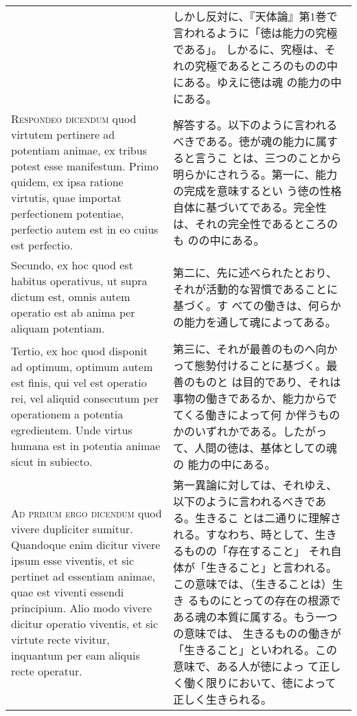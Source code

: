\documentclass[10pt]{jsarticle}
\begin{document}
\begin{longtable}{p{21em}p{21em}}
&

しかし反対に、『天体論』第1巻で言われるように「徳は能力の究極である」。
しかるに、究極は、それの究極であるところのものの中にある。ゆえに徳は魂
の能力の中にある。

\\

{\scshape Respondeo dicendum} quod virtutem pertinere ad potentiam
animae, ex tribus potest esse manifestum. Primo quidem, ex ipsa
ratione virtutis, quae importat perfectionem potentiae, perfectio
autem est in eo cuius est perfectio.

&

解答する。以下のように言われるべきである。徳が魂の能力に属すると言うこ
とは、三つのことから明らかにされうる。第一に、能力の完成を意味するとい
う徳の性格自体に基づいてである。完全性は、それの完全性であるところのも
のの中にある。

\\

Secundo, ex hoc quod est habitus operativus, ut supra dictum est,
omnis autem operatio est ab anima per aliquam potentiam.

&

第二に、先に述べられたとおり、それが活動的な習慣であることに基づく。す
べての働きは、何らかの能力を通して魂によってある。

\\

Tertio, ex hoc quod disponit ad optimum, optimum autem est finis, qui
vel est operatio rei, vel aliquid consecutum per operationem a
potentia egredientem. Unde virtus humana est in potentia animae sicut
in subiecto.

&

第三に、それが最善のものへ向かって態勢付けることに基づく。最善のものと
は目的であり、それは事物の働きであるか、能力からでてくる働きによって何
か伴うものかのいずれかである。したがって、人間の徳は、基体としての魂の
能力の中にある。

\\

{\scshape Ad primum ergo dicendum} quod vivere dupliciter
sumitur. Quandoque enim dicitur vivere ipsum esse viventis, et sic
pertinet ad essentiam animae, quae est viventi essendi
principium. Alio modo vivere dicitur operatio viventis, et sic virtute
recte vivitur, inquantum per eam aliquis recte operatur.

&

第一異論に対しては、それゆえ、以下のように言われるべきである。生きるこ
とは二通りに理解される。すなわち、時として、生きるものの「存在すること」
それ自体が「生きること」と言われる。この意味では、（生きることは）生き
るものにとっての存在の根源である魂の本質に属する。もう一つの意味では、
生きるものの働きが「生きること」といわれる。この意味で、ある人が徳によっ
て正しく働く限りにおいて、徳によって正しく生きられる。


\end{longtable}
\end{document}
